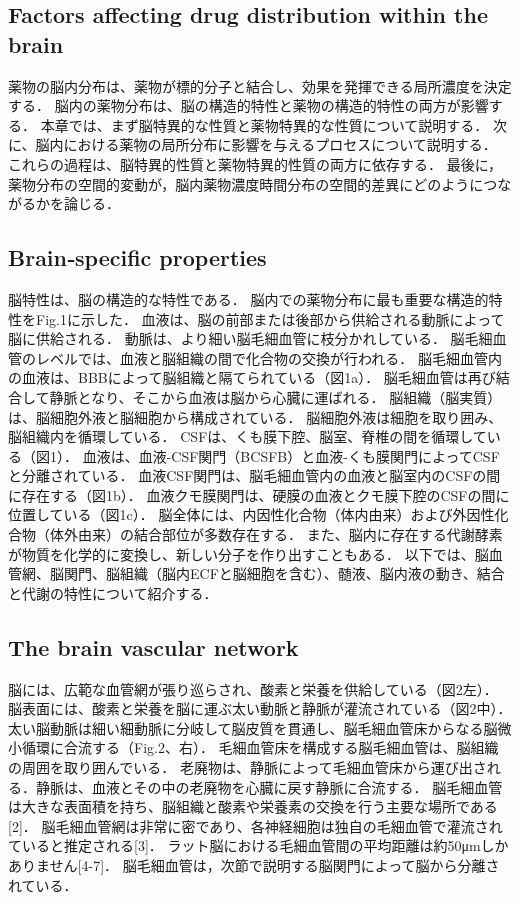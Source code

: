 \documentclass[11pt,a4paper]{jsarticle}
\begin{document}
\subsection{Factors affecting drug distribution within the brain}
薬物の脳内分布は、薬物が標的分子と結合し、効果を発揮できる局所濃度を決定する．
脳内の薬物分布は、脳の構造的特性と薬物の構造的特性の両方が影響する．
本章では、まず脳特異的な性質と薬物特異的な性質について説明する．
次に、脳内における薬物の局所分布に影響を与えるプロセスについて説明する．
これらの過程は、脳特異的性質と薬物特異的性質の両方に依存する．
最後に，薬物分布の空間的変動が，脳内薬物濃度時間分布の空間的差異にどのようにつながるかを論じる．
\subsection{Brain‑specific properties}
脳特性は、脳の構造的な特性である．
脳内での薬物分布に最も重要な構造的特性をFig.1に示した．
血液は、脳の前部または後部から供給される動脈によって脳に供給される．
動脈は、より細い脳毛細血管に枝分かれしている．
脳毛細血管のレベルでは、血液と脳組織の間で化合物の交換が行われる．
脳毛細血管内の血液は、BBBによって脳組織と隔てられている（図1a）．
脳毛細血管は再び結合して静脈となり、そこから血液は脳から心臓に運ばれる．
脳組織（脳実質）は、脳細胞外液と脳細胞から構成されている．
脳細胞外液は細胞を取り囲み、脳組織内を循環している．
CSFは、くも膜下腔、脳室、脊椎の間を循環している（図1）．
血液は、血液-CSF関門（BCSFB）と血液-くも膜関門によってCSFと分離されている．
血液CSF関門は、脳毛細血管内の血液と脳室内のCSFの間に存在する（図1b）．
血液クモ膜関門は、硬膜の血液とクモ膜下腔のCSFの間に位置している（図1c）．
脳全体には、内因性化合物（体内由来）および外因性化合物（体外由来）の結合部位が多数存在する．
また、脳内に存在する代謝酵素が物質を化学的に変換し、新しい分子を作り出すこともある．
以下では、脳血管網、脳関門、脳組織（脳内ECFと脳細胞を含む）、髄液、脳内液の動き、結合と代謝の特性について紹介する．
\subsection{The brain vascular network}
脳には、広範な血管網が張り巡らされ、酸素と栄養を供給している（図2左）．
脳表面には、酸素と栄養を脳に運ぶ太い動脈と静脈が灌流されている（図2中）．
太い脳動脈は細い細動脈に分岐して脳皮質を貫通し、脳毛細血管床からなる脳微小循環に合流する（Fig.2、右）．
毛細血管床を構成する脳毛細血管は、脳組織の周囲を取り囲んでいる．
老廃物は、静脈によって毛細血管床から運び出される．静脈は、血液とその中の老廃物を心臓に戻す静脈に合流する．
脳毛細血管は大きな表面積を持ち、脳組織と酸素や栄養素の交換を行う主要な場所である [2]．
脳毛細血管網は非常に密であり、各神経細胞は独自の毛細血管で灌流されていると推定される[3]．
ラット脳における毛細血管間の平均距離は約50μmしかありません[4-7]．
脳毛細血管は，次節で説明する脳関門によって脳から分離されている．
\end{document}
